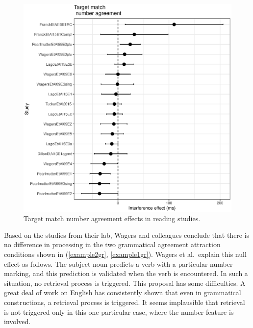 \documentclass{cambridge7A}\usepackage[]{graphicx}\usepackage[]{color}
\makeatletter
\def\maxwidth{ %
  \ifdim\Gin@nat@width>\linewidth
    \linewidth
  \else
    \Gin@nat@width
  \fi
}
\newenvironment{knitrout}{}{} %
\makeatother
\begin{document}
\begin{figure}[!htbp]
\centering
\begin{knitrout}
\color{fgcolor}

{\centering \includegraphics[width=\maxwidth]{figures/fig-matchnumagrmtplot-1} 

}



\end{knitrout}
\caption{Target match number agreement effects in reading studies.}\label{fig:matchnumagrmt}
\end{figure}


Based on the studies from their lab, Wagers and colleagues conclude that there is no difference in processing in the two grammatical agreement attraction conditions  shown in  (\ref{example2gr}, \ref{example1gr}). Wagers et al.\ explain this null effect as follows. The subject noun predicts a verb with a particular number marking, and this prediction is validated when the verb is encountered. In such a situation, no retrieval process is triggered.  This proposal has some difficulties. A great deal of work on English \citep{Gibson2000,grodner,Bartek2011} has consistently shown that even in grammatical constructions, a retrieval process is triggered. It seems implausible that retrieval is not triggered only in this one particular case, where the number feature is involved.
\end{document}
